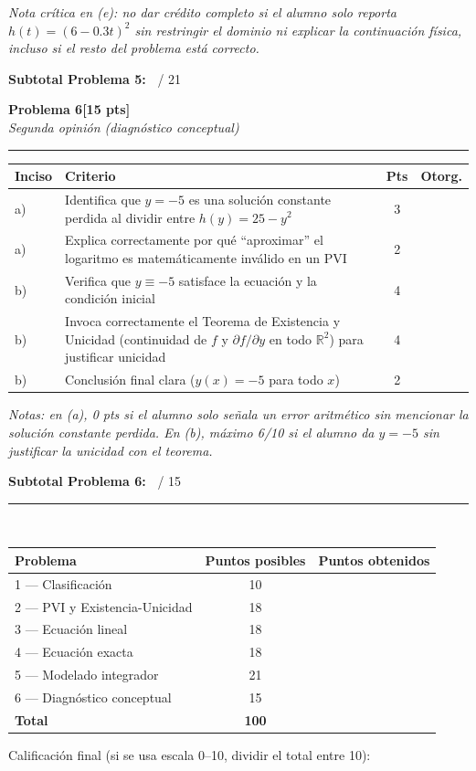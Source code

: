 \documentclass[11pt,letterpaper]{article}
\makeatletter
\newcommand{\problema}[3]{%
  \bigskip\bigskip\noindent
  {\Large\textbf{Problema #1}}\hfill\textbf{[#2 pts]}\\[3pt]
  {\small\itshape #3}\par
  \vspace{2pt}\hrule\vspace{8pt}
}
\newenvironment{tablarubrica}{%
  \begin{tabular}{@{}p{1.1cm}Lcc@{}}
  \toprule
  \textbf{Inciso} & \textbf{Criterio} & \textbf{Pts} & \textbf{Otorg.} \\
  \midrule
}{%
  \bottomrule
  \end{tabular}
}
\makeatother
\begin{document}
\textit{Nota crítica en (e): no dar crédito completo si el alumno solo reporta $h(t)=(6-0.3t)^2$ sin restringir el dominio ni explicar la continuación física, incluso si el resto del problema está correcto.}

\medskip
\noindent\textbf{Subtotal Problema 5:\ } \underline{\hspace{2.5cm}} / 21

\newpage
\problema{6}{15}{Segunda opinión (diagnóstico conceptual)}

\begin{tablarubrica}
a) & Identifica que $y=-5$ es una solución constante perdida al dividir entre $h(y)=25-y^2$ & 3 & \\
a) & Explica correctamente por qué ``aproximar'' el logaritmo es matemáticamente inválido en un PVI & 2 & \\
b) & Verifica que $y\equiv-5$ satisface la ecuación y la condición inicial & 4 & \\
b) & Invoca correctamente el Teorema de Existencia y Unicidad (continuidad de $f$ y $\partial f/\partial y$ en todo $\mathbb{R}^2$) para justificar unicidad & 4 & \\
b) & Conclusión final clara ($y(x)=-5$ para todo $x$) & 2 & \\
\end{tablarubrica}

\textit{Notas: en (a), 0 pts si el alumno solo señala un error aritmético sin mencionar la solución constante perdida. En (b), máximo 6/10 si el alumno da $y=-5$ sin justificar la unicidad con el teorema.}

\medskip
\noindent\textbf{Subtotal Problema 6:\ } \underline{\hspace{2.5cm}} / 15

\vspace{14pt}\hrule\vspace{10pt}

\\[4pt]
\begin{tabular}{lcc}
\toprule
Problema & Puntos posibles & Puntos obtenidos \\
\midrule
1 --- Clasificación & 10 & \\
2 --- PVI y Existencia-Unicidad & 18 & \\
3 --- Ecuación lineal & 18 & \\
4 --- Ecuación exacta & 18 & \\
5 --- Modelado integrador & 21 & \\
6 --- Diagnóstico conceptual & 15 & \\
\midrule
\textbf{Total} & \textbf{100} & \\
\bottomrule
\end{tabular}

\vspace{10pt}
\noindent Calificación final (si se usa escala 0--10, dividir el total entre 10): \underline{\hspace{3cm}}
\end{document}
